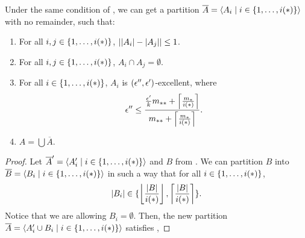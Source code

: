         \begin{lemma} \label{lem:existance_of_excellent_partition_with_equal_size_and_no_remainder}
            Under the same condition of , we can get a
            partition $\overline{A} = \left< A_i \mid i \in \{ 1, \dots, i(*) \} \right>$ with no remainder, such that:
            \begin{enumerate}[label=(\alph*), ref=\alph*]
                \item \label{itm:existance_of_excellent_partition_with_equal_size_and_no_remainder.a}
                    For all $i, j \in \{ 1, \dots, i(*) \}$, $| | A_i |- | A_j | | \leq 1$.
                \item \label{itm:existance_of_excellent_partition_with_equal_size_and_no_remainder.b}
                    For all $i, j \in \{ 1, \dots, i(*) \}$, $A_i \cap A_j = \emptyset$.
                \item \label{itm:existance_of_excellent_partition_with_equal_size_and_no_remainder.c}
                    For all $i \in \{ 1, \dots, i(*) \}$, $A_i$ is $( \epsilon'', \epsilon' )$-excellent, where
                    \[
                        \epsilon'' \leq \frac{\frac{\epsilon'}{k} m_{**} + \left\lceil \frac{m_*}{i(*)} \right\rceil}{m_{**} + \left\lceil \frac{m_*}{i(*)} \right\rceil}.
                    \]
                \item \label{itm:existance_of_excellent_partition_with_equal_size_and_no_remainder.d} $A = \bigcup \overline{A}$.
            \end{enumerate}
            \begin{proof}
                Let $\overline{A}' = \left< A_i' \mid i \in \{ 1, \dots, i(*) \} \right>$ and $B$ from
                .
                We can partition $B$ into $\overline{B} = \left< B_i \mid i \in \{ 1, \dots, i(*) \} \right>$ in such a way that
                for all $i \in \{ 1, \dots, i(*) \}$,
                \[
                    |B_i| \in \{ \left\lfloor \frac{| B |}{i(*)} \right\rfloor, \left\lceil \frac{| B |}{i(*)} \right\rceil \}.
                \]
                Notice that we are allowing $B_i = \emptyset$.
                Then, the new partition $\overline{A} = \left< A_i' \cup B_i \mid i \in \{ 1, \dots, i(*) \} \right>$ satisfies
                ,

\end{proof}
\end{lemma}
